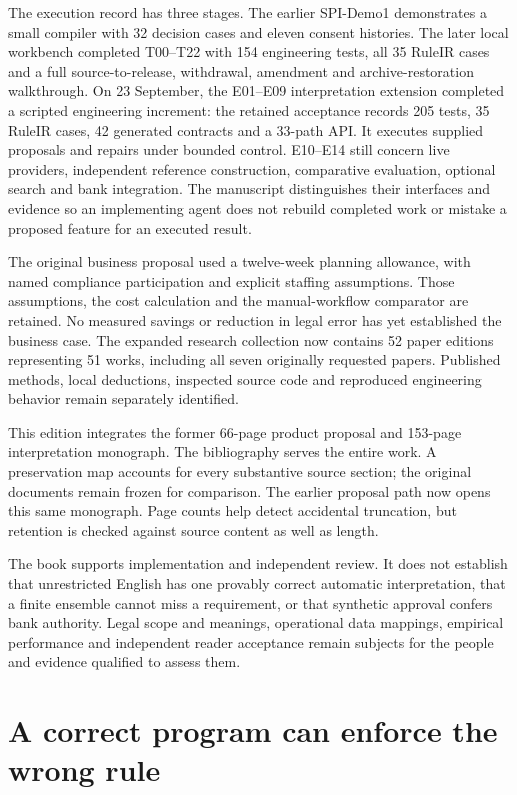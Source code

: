\documentclass[12pt,a4paper,oneside,openany]{book}
\begin{document}
The execution record has three stages. The earlier SPI-Demo1 demonstrates a
small compiler with 32 decision cases and eleven consent histories. The later
local workbench completed T00--T22 with 154 engineering tests, all 35 RuleIR
cases and a full source-to-release, withdrawal, amendment and archive-restoration
walkthrough. On 23 September, the E01--E09 interpretation extension completed
a scripted engineering increment: the retained acceptance records 205 tests,
35 RuleIR cases, 42 generated contracts and a 33-path API. It executes
supplied proposals and repairs under bounded control. E10--E14 still concern
live providers, independent reference construction, comparative evaluation,
optional search and bank integration. The manuscript distinguishes their
interfaces and evidence so an implementing agent does not rebuild completed
work or mistake a proposed feature for an executed result.

The original business proposal used a twelve-week planning allowance, with
named compliance participation and explicit staffing assumptions. Those
assumptions, the cost calculation and the manual-workflow comparator are retained.
No measured savings or reduction in legal error has yet established the business
case. The expanded research collection now contains 52 paper editions representing
51 works, including all seven originally requested papers. Published methods,
local deductions, inspected source code and reproduced engineering behavior
remain separately identified.

This edition integrates the former 66-page product proposal and 153-page
interpretation monograph. The bibliography serves the entire work. A
preservation map accounts for every substantive source section;
the original documents remain frozen for comparison. The earlier proposal path
now opens this same monograph. Page counts help detect accidental truncation,
but retention is checked against source content as well as length.

The book supports implementation and independent review. It does not establish
that unrestricted English has one provably correct automatic interpretation,
that a finite ensemble cannot miss a requirement, or that synthetic approval
confers bank authority. Legal scope and meanings, operational data mappings,
empirical performance and independent reader acceptance remain subjects for
the people and evidence qualified to assess them.

\tableofcontents
\mainmatter
\chapter{A correct program can enforce the wrong rule}
\label{ch:problem}
\end{document}

